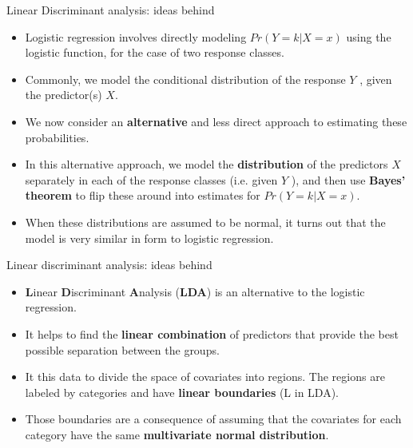 \documentclass{beamer}
\begin{document}
\begin{frame}{Linear Discriminant analysis: ideas behind}
	\begin{itemize}
	\item
	Logistic regression involves directly modeling $Pr(Y = k|X = x)$ using the
	logistic function, for the case of two response classes. 
	\vspace{0.2cm}	  
	\item
	Commonly, we model the conditional distribution of the response $Y$ ,
	given the predictor(s) $X$. 
	\vspace{0.2cm}	  
	\item
	We now consider an \textbf{alternative} and less direct
	approach to estimating these probabilities. 

	\vspace{0.2cm}	  
\item
In this alternative approach,
we model the \textbf{distribution} of the predictors $X$ separately in each of the
response classes (i.e. given $Y$ ), and then use\textbf{ Bayes' theorem} to flip these
around into estimates for $Pr(Y = k|X = x)$. 
\vspace{0.2cm}	  
\item
When these distributions are
assumed to be normal, it turns out that the model is very similar in form
to logistic regression.
\end{itemize}
\end{frame}


\begin{frame}{Linear discriminant analysis: ideas behind}
	\begin{itemize}
		\item
		\textbf{L}inear \textbf{D}iscriminant \textbf{A}nalysis (\textbf{LDA}) is an alternative to the logistic regression.
				\vspace{0.2cm}	
		\item
		It helps to find the \textbf{linear combination }of predictors that provide the best possible separation between the groups.
		\vspace{0.2cm}	
		\item
		It this data to divide the space of covariates into regions. The regions are labeled by categories and have \textbf{linear boundaries} (L in LDA).	
	\vspace{0.2cm}	
		\item
		Those boundaries are a consequence of assuming that the covariates for each category have the same \textbf{multivariate normal distribution}.
	\end{itemize}
\end{frame}
\end{document}
